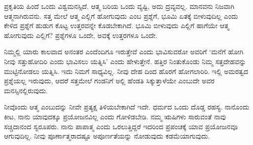 ಪ್ರಕೃತಿಯ ಹಿಂದೆ ಒಂದು ವಿಶ್ವಮನಸ್ಸಿದೆ. ಆತ್ಮ ಬರಿಯ ಒಂದು ವ್ಯಷ್ಟಿ, ಅದು ದ್ರವ್ಯವಲ್ಲ. ಮಾನವನು ನಿಜವಾಗಿ ಆತ್ಮನಾಗಿರುವನು. ಸತ್ತ ಮೇಲೆ ಆತ್ಮ ಎಲ್ಲಿಗೆ ಹೋಗುವುದು ಎಂಬ ಪ್ರಶ್ನೆಗೆ, ಭೂಮಿ ಏತಕ್ಕೆ ಬೀಳುವುದಿಲ್ಲ ಎಂದು ಕೇಳಿದ ಪ್ರಶ್ನೆಗೆ ಹುಡುಗ ಕೊಟ್ಟ ಉತ್ತರವನ್ನೇ ಕೊಡಬೇಕಾಗಿದೆ. ಭೂಮಿ ಬೀಳುವುದು ಎಲ್ಲಿಗೆ ಹಾಗೆಯೇ ಆತ್ಮ ಹೋಗುವುದು ಎಲ್ಲಿಗೆ? ಪ್ರಶ್ನೆಗಳೂ ಒಂದೇ, ಅವಕ್ಕೆ ಉತ್ತರಗಳೂ ಒಂದೇ.

ನಿಮ್ಮಲ್ಲಿ ಯಾರು ಕಾಲವಾದ ಅನಂತರ ಎಂದೆಂದಿಗೂ ಇರುತ್ತೇವೆ ಎಂದು ಭಾವಿಸುವರೋ ಅವರಿಗೆ ‘ಮನೆಗೆ ಹೋಗಿ ನೀವು ಸತ್ತುಹೋದಿರಿ ಎಂದು ಭಾವಿಸಲು ಯತ್ನಿಸಿ’ ಎಂದು ಹೇಳುತ್ತೇನೆ. ಹತ್ತಿರ ನಿಂತುಕೊಂಡು ನಿಮ್ಮ ಸತ್ತದೇಹವನ್ನು ಮುಟ್ಟಿನೋಡಲು ಯತ್ನಿಸಿ. ಇದು ನಿಮಗೆ ಸಾಧ್ಯವಿಲ್ಲ. ನೀವು ದೇಹ ದಿಂದ ಹೊರಗೆ ಹೋಗಲಾರಿರಿ. ಇಲ್ಲಿ ಅಮರತ್ವದ ಪ್ರಶ್ನೆಯಲ್ಲ ಇರುವುದು, ಆದರೆ ಸತ್ತಮೇಲೆ ಗಂಡನಿಗೆ ಅಲ್ಲಿ ಹೆಂಡತಿ ಸಿಕ್ಕುತ್ತಾಳೆಯೇ ಎಂಬುದೇ ಅವರ ಮನಸ್ಸಿನಲ್ಲಿರುವುದು.

ನೀವೊಂದು ಆತ್ಮ ಎಂಬುದನ್ನು ನೀವೇ ಪ್ರತ್ಯಕ್ಷ ತಿಳಿಯಬೇಕಾಗಿದೆ ಇದೇ. ಧರ್ಮದ ಒಂದು ದೊಡ್ಡ ರಹಸ್ಯ. ನಾನೊಂದು ಕೀಟ, ನಾನು ಯಾವುದಕ್ಕೂ ಪ್ರಯೋಜನವಿಲ್ಲ ಎಂದು ಗೋಳಿಡಬೇಡಿ. ನಮ್ಮ ಋಷಿಗಳು ಸಾರುವಂತೆ ನಾವು ಸಚ್ಚಿದಾನಂದ ಸ್ವರೂಪರು. ನಾನು ಪಾಪಾತ್ಮ ಎಂದು ಒರಲುತ್ತಿದ್ದರೆ ಇದರಿಂದ ಪ್ರಪಂಚಕ್ಕೆ ಯಾವ ಪ್ರಯೋಜನವೂ ಆಗುವುದಿಲ್ಲ. ನೀವು ಪೂರ್ಣಾತ್ಮರಾದಷ್ಟೂ ಅಪೂರ್ಣತೆಯನ್ನು ನೋಡುವುದು ಕಡಮೆಯಾಗುವುದು.

